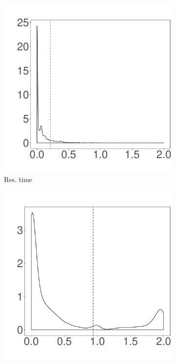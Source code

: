 \begin{figure}[t]
	\centering
        \begin{subfigure}{0.19\textwidth}
                \includegraphics[width=\linewidth]{Figures/runtime-hadoop-cluster.pdf}
                \caption{Res. time}
        \end{subfigure}%
        \begin{subfigure}{0.19\textwidth}
                \includegraphics[width=\linewidth]{Figures/cpu-hadoop-cluster.pdf}

\end{subfigure}
\end{figure}
